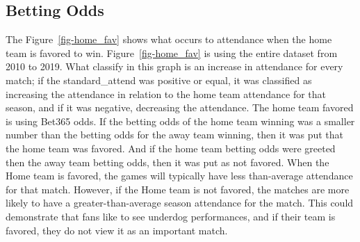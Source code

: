\documentclass[
  letterpaper,
  DIV=11,
  numbers=noendperiod]{scrartcl}
\begin{document}
\hypertarget{betting-odds-1}{%
\subsection{Betting Odds}\label{betting-odds-1}}

The Figure~\ref{fig-home_fav} shows what occurs to attendance when the
home team is favored to win. Figure~\ref{fig-home_fav} is using the
entire dataset from 2010 to 2019. What classify in this graph is an
increase in attendance for every match; if the standard\_attend was
positive or equal, it was classified as increasing the attendance in
relation to the home team attendance for that season, and if it was
negative, decreasing the attendance. The home team favored is using
Bet365 odds. If the betting odds of the home team winning was a smaller
number than the betting odds for the away team winning, then it was put
that the home team was favored. And if the home team betting odds were
greeted then the away team betting odds, then it was put as not favored.
When the Home team is favored, the games will typically have less
than-average attendance for that match. However, if the Home team is not
favored, the matches are more likely to have a greater-than-average
season attendance for the match. This could demonstrate that fans like
to see underdog performances, and if their team is favored, they do not
view it as an important match.
\end{document}
